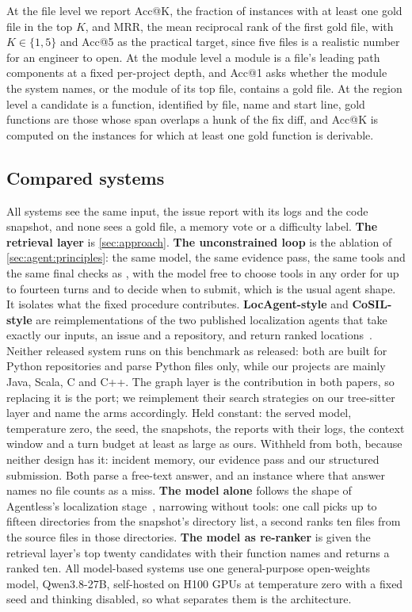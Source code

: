At the file level we report Acc@K, the
fraction of instances with at least one gold file in the top $K$, and
MRR, the mean reciprocal rank of the first gold file, with
$K \in \{1, 5\}$ and Acc@5 as the practical target, since five files is
a realistic number for an engineer to open. At the module level a
module is a file's leading path components at a fixed per-project
depth, and Acc@1 asks whether the module the system names, or the
module of its top file, contains a gold file. At the region level a
candidate is a function, identified by file, name and start line, gold
functions are those whose span overlaps a hunk of the fix diff, and
Acc@K is computed on the instances for which at least one gold function
is derivable.

\subsection{Compared systems}
\label{sec:setup:systems}

All systems see the same input, the issue report with its logs and the
code snapshot, and none sees a gold file, a memory vote or a difficulty
label. \textbf{The retrieval layer} is \cref{sec:approach}. \textbf{The
unconstrained loop} is the ablation of \cref{sec:agent:principles}: the
same model, the same evidence pass, the same tools and the same final
checks as \sys{}, with the model free to choose tools in any order for
up to fourteen turns and to decide when to submit, which is the usual
agent shape. It isolates what the fixed procedure contributes.
\textbf{LocAgent-style} and \textbf{CoSIL-style} are reimplementations
of the two published localization agents that take exactly our inputs,
an issue and a repository, and return ranked
locations~\cite{chen2025locagent,jiang2025cosil}. Neither released
system runs on this benchmark as released: both are built for Python
repositories and parse Python files only, while our projects are
mainly Java, Scala, C and C++. The graph layer
is the contribution in both papers, so replacing it is the port; we
reimplement their search strategies on our tree-sitter layer and name
the arms accordingly.
Held constant: the served model, temperature zero, the seed, the
snapshots, the reports with their logs, the context window and a turn
budget at least as large as ours. Withheld from both, because neither
design has it: incident memory, our evidence pass and our structured
submission. Both parse a free-text answer, and an instance where that
answer names no file counts as a miss. \textbf{The model alone} follows
the shape of Agentless's localization stage~\cite{xia2025agentless},
narrowing without tools: one
call picks up to fifteen directories from the snapshot's directory
list, a second ranks ten files from the source files in those
directories. \textbf{The model as re-ranker} is given the retrieval
layer's top twenty candidates with their function names and returns a
ranked ten. All model-based systems use one general-purpose
open-weights model, Qwen3.8-27B, self-hosted on H100 GPUs at
temperature zero with a fixed seed and thinking disabled, so what
separates them is the architecture.

